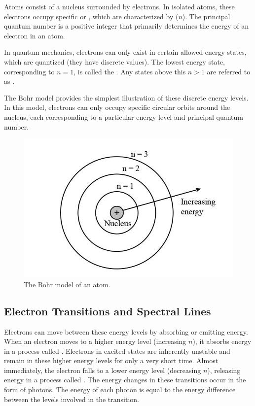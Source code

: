 Atoms consist of a nucleus surrounded by electrons. In isolated atoms, these electrons occupy specific  or , which are characterized by  ($n$). The principal quantum number is a positive integer that primarily determines the energy of an electron in an atom. 

In quantum mechanics, electrons can only exist in certain allowed energy states, which are quantized (they have discrete values). The lowest energy state, corresponding to $n = 1$, is called the . Any states above this $n > 1$ are referred to as .

The Bohr model provides the simplest illustration of these discrete energy levels. In this model, electrons can only occupy specific circular orbits around the nucleus, each corresponding to a particular energy level and principal quantum number.

\begin{figure}[H]
    \centering
    \includegraphics[scale=0.6]{media/Bohr Model.jpg}
    \caption{The Bohr model of an atom.}
\end{figure}

\subsection{Electron Transitions and Spectral Lines}

Electrons can move between these energy levels by absorbing or emitting energy. When an electron moves to a higher energy level (increasing $n$), it absorbs energy in a process called . Electrons in excited states are inherently unstable and remain in these higher energy levels for only a very short time. Almost immediately, the electron falls to a lower energy level (decreasing $n$), releasing energy in a process called . The energy changes in these transitions occur in the form of photons. The energy of each photon is equal to the energy difference between the levels involved in the transition.

